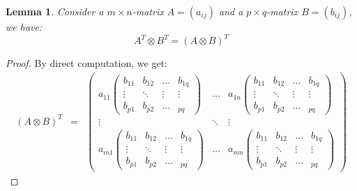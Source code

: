 \documentclass[a4paper,11pt]{report}
\newtheorem{lemma}[theorem]{Lemma}
\begin{document}
\begin{lemma}\label{hulptensor}
  Consider a $m \times 
  n$-matrix $A = (a_{ij})$ and a $p \times q$-matrix $B=(b_{ij})$, we have:
  $$A^T \otimes B^T = (A\otimes B)^T$$
\end{lemma}
\begin{proof}
  By direct computation, we get:
  \allowdisplaybreaks
  \begin{eqnarray*}
    (A \otimes B)^T  &=& \begin{pmatrix}
  a_{11}\begin{pmatrix}
  b_{11} & b_{12} & \ldots & b_{1q}\\
  \vdots & \ddots & \vdots &\vdots\\
  b_{p1} & b_{p2} & \ldots & _{pq}
  \end{pmatrix}
  
 & \ldots & a_{1n}\begin{pmatrix}
  b_{11} & b_{12} & \ldots & b_{1q}\\
  \vdots & \ddots & \vdots &\vdots\\
  b_{p1} & b_{p2} & \ldots & _{pq}
  \end{pmatrix}
\\
  \vdots & \ddots & \vdots \\
  a_{m1}\begin{pmatrix}
  b_{11} & b_{12} & \ldots & b_{1q}\\
  \vdots & \ddots & \vdots &\vdots\\
  b_{p1} & b_{p2} & \ldots & _{pq}
  \end{pmatrix}
 & \ldots & a_{mn}\begin{pmatrix}
  b_{11} & b_{12} & \ldots & b_{1q}\\
  \vdots & \ddots & \vdots &\vdots\\
  b_{p1} & b_{p2} & \ldots & _{pq}
  \end{pmatrix}


\end{pmatrix}
\end{eqnarray*}
\end{proof}
\end{document}
